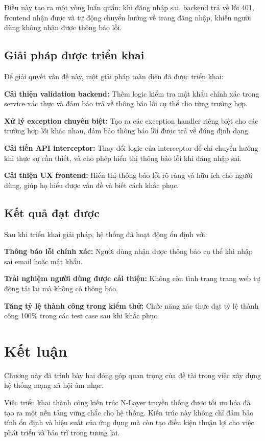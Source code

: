 Điều này tạo ra một vòng luẩn quẩn: khi đăng nhập sai, backend trả về lỗi 401, frontend nhận được và tự động chuyển hướng về trang đăng nhập, khiến người dùng không nhận được thông báo lỗi.

\subsection{Giải pháp được triển khai}

Để giải quyết vấn đề này, một giải pháp toàn diện đã được triển khai:

\textbf{Cải thiện validation backend:} Thêm logic kiểm tra mật khẩu chính xác trong service xác thực và đảm bảo trả về thông báo lỗi cụ thể cho từng trường hợp.

\textbf{Xử lý exception chuyên biệt:} Tạo ra các exception handler riêng biệt cho các trường hợp lỗi khác nhau, đảm bảo thông báo lỗi được trả về đúng định dạng.

\textbf{Cải tiến API interceptor:} Thay đổi logic của interceptor để chỉ chuyển hướng khi thực sự cần thiết, và cho phép hiển thị thông báo lỗi khi đăng nhập sai.

\textbf{Cải thiện UX frontend:} Hiển thị thông báo lỗi rõ ràng và hữu ích cho người dùng, giúp họ hiểu được vấn đề và biết cách khắc phục.

\subsection{Kết quả đạt được}

Sau khi triển khai giải pháp, hệ thống đã hoạt động ổn định với:

\textbf{Thông báo lỗi chính xác:} Người dùng nhận được thông báo cụ thể khi nhập sai email hoặc mật khẩu.

\textbf{Trải nghiệm người dùng được cải thiện:} Không còn tình trạng trang web tự động tải lại mà không có thông báo.

\textbf{Tăng tỷ lệ thành công trong kiểm thử:} Chức năng xác thực đạt tỷ lệ thành công 100\% trong các test case sau khi khắc phục.

\section{Kết luận}

Chương này đã trình bày hai đóng góp quan trọng của đề tài trong việc xây dựng hệ thống mạng xã hội âm nhạc. 

Việc triển khai thành công kiến trúc N-Layer truyền thống được tối ưu hóa đã tạo ra một nền tảng vững chắc cho hệ thống. Kiến trúc này không chỉ đảm bảo tính ổn định và hiệu suất của ứng dụng mà còn tạo điều kiện thuận lợi cho việc phát triển và bảo trì trong tương lai.

